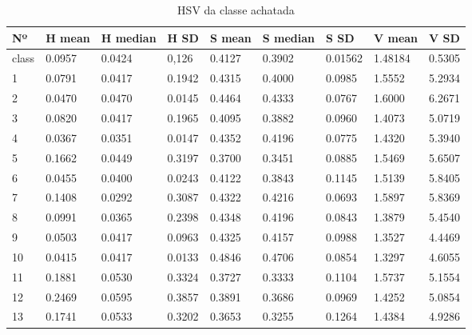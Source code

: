 \begin{anexosenv}
\begin{table}[htbp!]
\centering
\caption{HSV da classe achatada}
\label{tab:cores_classe_achatada}
\begin{tabular}{|l|l|l|l|l|l|l|l|l|}
\hline
Nº & H mean & H median & H SD & S mean & S median & S SD & V mean & V SD \\ \hline
class & 0.0957 & 0.0424   & 0,126                & 0.4127 & 0.3902   & 0.01562              & 1.48184 & 0.5305               \\\hline
1    & 0.0791 & 0.0417   & 0.1942               & 0.4315 & 0.4000   & 0.0985               & 1.5552  & 5.2934               \\
2    & 0.0470 & 0.0470   & 0.0145               & 0.4464 & 0.4333   & 0.0767               & 1.6000  & 6.2671               \\
3    & 0.0820 & 0.0417   & 0.1965               & 0.4095 & 0.3882   & 0.0960               & 1.4073  & 5.0719               \\
4    & 0.0367 & 0.0351   & 0.0147               & 0.4352 & 0.4196   & 0.0775               & 1.4320  & 5.3940               \\
5    & 0.1662 & 0.0449   & 0.3197               & 0.3700 & 0.3451   & 0.0885               & 1.5469  & 5.6507               \\
6    & 0.0455 & 0.0400   & 0.0243               & 0.4122 & 0.3843   & 0.1145               & 1.5139  & 5.8405               \\
7    & 0.1408 & 0.0292   & 0.3087               & 0.4322 & 0.4216   & 0.0693               & 1.5897  & 5.8369               \\
8    & 0.0991 & 0.0365   & 0.2398               & 0.4348 & 0.4196   & 0.0843               & 1.3879  & 5.4540               \\
9    & 0.0503 & 0.0417   & 0.0963               & 0.4325 & 0.4157   & 0.0988               & 1.3527  & 4.4469               \\
10   & 0.0415 & 0.0417   & 0.0133               & 0.4846 & 0.4706   & 0.0854               & 1.3297  & 4.6055               \\
11   & 0.1881 & 0.0530   & 0.3324               & 0.3727 & 0.3333   & 0.1104               & 1.5737  & 5.1554               \\
12   & 0.2469 & 0.0595   & 0.3857               & 0.3891 & 0.3686   & 0.0969               & 1.4252  & 5.0854               \\
13   & 0.1741 & 0.0533   & 0.3202               & 0.3653 & 0.3255   & 0.1264               & 1.4384  & 4.9286               \\

\end{tabular}
\end{table}
\end{anexosenv}
